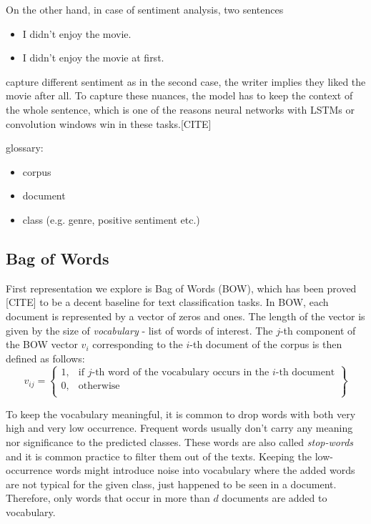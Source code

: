 On the other hand, in case of sentiment analysis, two sentences
\begin{itemize}
    \item I didn't enjoy the movie.
    \item I didn't enjoy the movie at first.
\end{itemize}
capture different sentiment as in the second case, the writer implies they liked the movie after all. To capture these nuances, the model has to keep the context of the whole sentence, which is one of the reasons neural networks with LSTMs or convolution windows win in these tasks.[CITE]

glossary:
\begin{itemize}
    \item corpus
    \item document
    \item class (e.g. genre, positive sentiment etc.)
\end{itemize}

\subsection{Bag of Words}
First representation we explore is Bag of Words (BOW), which has been proved [CITE] to be a decent baseline for text classification tasks. In BOW, each document is represented by a vector of zeros and ones. The length of the vector is given by the size of \textit{vocabulary} - list of words of interest. The $j$-th component of the BOW vector $v_i$ corresponding to the $i$-th document of the corpus is then defined as follows: 
$$
  v_{ij} = \left\{\begin{array}{ll}
      1, & \text{if } j \text{-th word of the vocabulary occurs in the }i \text{-th document}\\
      0, & \text{otherwise}\\
      \end{array}\right\}
$$

To keep the vocabulary meaningful, it is common to drop words with both very high and very low occurrence. Frequent words usually don't carry any meaning nor significance to the predicted classes. These words are also called \textit{stop-words} and it is common practice to filter them out of the texts. Keeping the low-occurrence words might introduce noise into vocabulary where the added words are not typical for the given class, just happened to be seen in a document. Therefore, only words that occur in more than $d$ documents are added to vocabulary.

